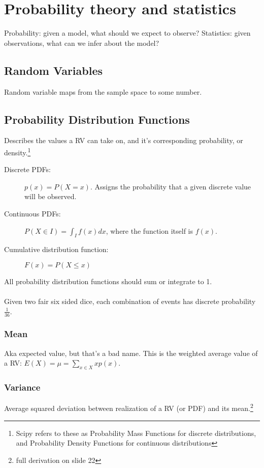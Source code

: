 \documentclass[a4paper]{article}
\begin{document}
\section{Probability theory and statistics}
Probability: given a model, what should we expect to observe?
Statistics: given observations, what can we infer about the model?

\subsection{Random Variables}
Random variable maps from the sample space to some number.

\subsection{Probability Distribution Functions}
Describes the values a RV can take on, and it's corresponding probability, or density.\footnote{Scipy refers to these as Probability Mass Functions for discrete distributions, and Probability Density Functions for continuous distributions}

\begin{description}
  \item[Discrete PDFs:] $p(x)=P(X=x)$. Assigns the probability that a given discrete value will be observed.
  \item[Continuous PDFs:] $P(X\in I)=\int_I f(x)dx$, where the function itself is $f(x)$.
  \item[Cumulative distribution function:] $F(x)=P(X\le x)$
\end{description}

All probability distribution functions should sum or integrate to 1.

\paragraph{}
Given two fair six sided dice, each combination of events has discrete probability $\frac{1}{36}$.

\subsubsection{Mean}
Aka expected value, but that's a bad name. This is the weighted average value of a RV: $E(X)=\mu=\sum\limits_{x\in X} x p(x)$.

\subsubsection{Variance}
Average squared deviation between realization of a RV (or PDF) and its mean.\footnote{full derivation on slide 22}
\end{document}
